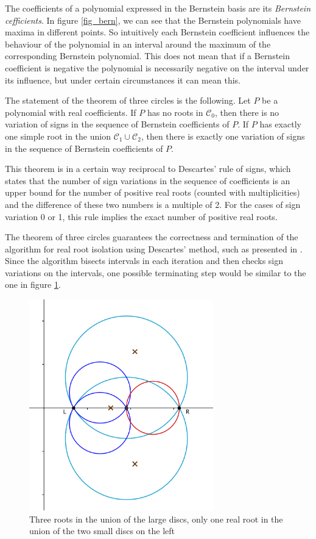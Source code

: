 \documentclass[11pt, a4paper]{article}
\newcommand{\ssc}{{\mathcal C}}
\begin{document}
The coefficients of a polynomial expressed in the Bernstein basis are its {\em Bernstein cefficients}. In figure \ref{fig_bern}, we can see that the Bernstein polynomials have maxima in different points. So intuitively each Bernstein coefficient influences the behaviour of the polynomial in an interval around the maximum of the corresponding Bernstein polynomial. This does not mean that if a Bernstein coefficient is negative the polynomial is necessarily negative on the interval under its influence, but under certain circumstances it can mean this.

The statement of the theorem of three circles is the following. Let $P$ be a polynomial with real coefficients. If $P$ has no roots in $\ssc_0$, then there is no variation of signs in the sequence of Bernstein coefficients of $P$. If $P$ has exactly one simple root in the union $\ssc_1 \cup \ssc_2$, then there is exactly one variation of signs in the sequence of Bernstein coefficients of $P$.

This theorem is in a certain way reciprocal to Descartes' rule of signs, which states that the number of sign variations in the sequence of coefficients is an upper bound for the number of positive real roots (counted with multiplicities) and the difference of these two numbers is a multiple of 2. For the cases of sign variation 0 or 1, this rule implies the exact number of positive real roots.

The theorem of three circles guarantees the correctness and termination of the algorithm for real root isolation using Descartes' method, such as presented in \cite{bpr}. Since the algorithm bisects intervals in each iteration and then checks sign variations on the intervals, one possible terminating step would be similar to the one in figure \ref{fig_4cercles}.

\begin{figure}[htb!]
\begin{centering}
\includegraphics[width=8cm]{3cercles_termination.png}
\caption{Three roots in the union of the large discs, only one real root in the union of the two small discs on the left}
\label{fig_4cercles}
\end{centering}
\end{figure}
\end{document}
